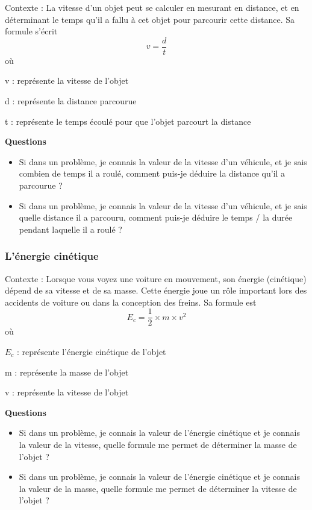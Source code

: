 \documentclass[a4paper,12pt]{article}
\begin{document}
Contexte : La vitesse d'un objet peut se calculer en mesurant en distance, et en déterminant le temps qu'il a fallu à cet objet pour parcourir cette distance. Sa formule s'écrit
  \[
  v = \frac{d}{t}
  \]
  où 

\begin{addmargin}[4em]{1em}
  \begin{compactitem}
      \item [v]: représente la vitesse de l'objet
      \item [d]: représente la distance parcourue
      \item [t]: représente le temps écoulé pour que l'objet parcourt la distance
\end{compactitem}
\end{addmargin}
\vspace{1em}
\textbf{Questions}
\begin{itemize}
  \item Si dans un problème, je connais la valeur de la vitesse d'un véhicule, et je sais combien de temps il a roulé, comment puis-je déduire la distance qu'il a parcourue ?
  \item Si dans un problème, je connais la valeur de la vitesse d'un véhicule, et je sais quelle distance il a parcouru, comment puis-je déduire le temps / la durée pendant laquelle il a roulé ?
\end{itemize}

\subsubsection*{L'énergie cinétique}

    Contexte : Lorsque vous voyez une voiture en mouvement, son énergie (cinétique) dépend de sa vitesse et de sa masse. Cette énergie joue un rôle important lors des accidents de voiture ou dans la conception des freins. Sa formule est 
    \[
    E_c = \frac{1}{2} \times m \times v^2
    \]
    où 

  \begin{addmargin}[4em]{1em}
    \begin{compactitem}
      \item [$E_c$]: représente l'énergie cinétique de l'objet
      \item [m]: représente la masse de l'objet 
      \item [v]: représente la vitesse de l'objet
  \end{compactitem}
  \end{addmargin}
  \vspace{1em}
  \textbf{Questions}
  \begin{itemize}
    \item Si dans un problème, je connais la valeur de l'énergie cinétique et je connais la valeur de la vitesse, quelle formule me permet de déterminer la masse de l'objet ?
    \item Si dans un problème, je connais la valeur de l'énergie cinétique et je connais la valeur de la masse, quelle formule me permet de déterminer la vitesse de l'objet ?
  \end{itemize}
\end{document}
